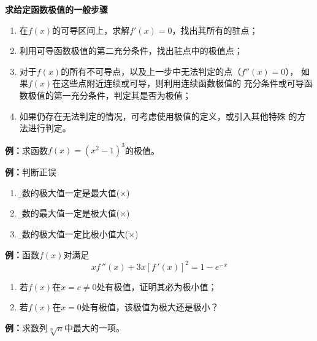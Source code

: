 \begin{thx}
	{\bf 求给定函数极值的一般步骤}
	\begin{enumerate}[(1)]
	  \item 在$f(x)$的可导区间上，求解$f'(x)=0$，找出其所有的驻点；
	  \item 利用可导函数极值的第二充分条件，找出驻点中的极值点；
	  \item 对于$f(x)$的所有不可导点，以及上一步中无法判定的点（$f''(x)=0$），
	  如果$f(x)$在这些点附近连续或可导，则利用连续函数极值的
	  充分条件或可导函数极值的第一充分条件，判定其是否为极值；
	  \item 如果仍存在无法判定的情况，可考虑使用极值的定义，或引入其他特殊
	  的方法进行判定。	  
	\end{enumerate}
\end{thx}

{\bf 例：}求函数$f(x)=(x^2-1)^3$的极值。

{\bf 例：}判断正误
\begin{enumerate}[(1)]
  \setlength{\itemindent}{1cm}
  \item {\b 函数的极大值一定是最大值\quad  ({$\times$})} 
  \item {\b 函数的最大值一定是极大值\quad  ({$\times$})} 
  \item {\b 函数的极大值一定比极小值大\quad  ({$\times$})} 
\end{enumerate}

{\bf 例：}函数$f(x)$对满足
$$xf\,''(x)+3x[f\,'(x)]^2=1-e^{-x}$$
\begin{enumerate}[(1)]
  \setlength{\itemindent}{1cm}
  \item 若$f(x)$在$x=c\ne 0$处有极值，证明其必为极小值；
  \item 若$f(x)$在$x=0$处有极值，该极值为极大还是极小？
\end{enumerate}

{\bf 例：}求数列$\sqrt[n]n$中最大的一项。

\begin{center}
\end{center}

